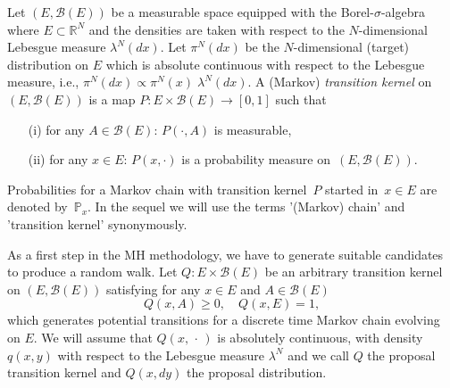 Let $ \left( E, \mathcal{B}(E) \right) $ be a measurable space equipped with the Borel-$\sigma$-algebra where $ E \subset \mathbb{R}^{N} $ and the densities are taken with respect to the $N$-dimensional Lebesgue measure $\lambda^{N}(dx)$. Let $ \pi^{N}(dx) $ be the $N$-dimensional (target) distribution on $ E $ which is absolute continuous with respect to the Lebesgue measure, i.e., $ \pi^{N}(dx) \varpropto \pi^{N}(x) \; \lambda^{N}(dx) $. A (Markov) \textit{transition kernel} on~$\left( E, \mathcal{B}(E) \right) $ is a map $ P : E \times \mathcal{B}(E)  \to [0,1]$ such that
\begin{enumerate}
 \item[(i)] for any $A \in \mathcal{B}(E)$: $P(\cdot, A) $ is measurable,
 \item[(ii)] for any $ x \in E $: $P(x, \cdot)$ is a probability measure on~$\left( E, \mathcal{B}(E) \right) $.
\end{enumerate}
Probabilities for a Markov chain with transition kernel~$P$ started in~$x \in E$ are denoted by~$ \mathbb{P}_x $. In the sequel  we will use the terms '(Markov) chain' and 'transition kernel' synonymously. 


As a first step in the MH methodology, we have to generate suitable candidates to produce a random walk. Let $ Q : E \times \mathcal{B}(E) $ be an arbitrary transition kernel on $\left( E, \mathcal{B}(E) \right) $ satisfying for any $ x \in E $ and $ A \in \mathcal{B}(E) $
\begin{equation}
\label{MH - proposal kernel}
 Q(x,A) \geq 0, \quad Q(x, E) = 1,
\end{equation}
which generates potential transitions for a discrete time Markov chain evolving on $ E $.  We will assume that $ Q(x, \, \cdot \,) $ is absolutely continuous, with density $ q(x,y) $  with respect to the Lebesgue measure $ \lambda^{N}$ and we call $Q$ the proposal transition kernel and $ Q(x,dy) $ the proposal distribution.



